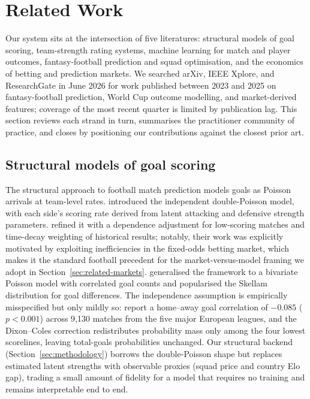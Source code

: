 \section{Related Work}
\label{sec:related_work}

Our system sits at the intersection of five literatures: structural
models of goal scoring, team-strength rating systems, machine
learning for match and player outcomes, fantasy-football prediction
and squad optimisation, and the economics of betting and prediction
markets. We searched arXiv, IEEE Xplore, and ResearchGate in June
2026 for work published between 2023 and 2025 on fantasy-football
prediction, World Cup outcome modelling, and market-derived features;
coverage of the most recent quarter is limited by publication lag.
This section reviews each strand in turn, summarises the practitioner
community of practice, and closes by positioning our contributions
against the closest prior art.

\subsection{Structural models of goal scoring}
\label{sec:related-structural}

The structural approach to football match prediction models goals as
Poisson arrivals at team-level rates. \citet{maher1982modelling}
introduced the independent double-Poisson model, with each side's
scoring rate derived from latent attacking and defensive strength
parameters. \citet{dixon1997modelling} refined it with a dependence
adjustment for low-scoring matches and time-decay weighting of
historical results; notably, their work was explicitly motivated by
exploiting inefficiencies in the fixed-odds betting market, which
makes it the standard football precedent for the market-versus-model
framing we adopt in Section~\ref{sec:related-markets}.
\citet{karlis2003analysis} generalised the framework to a bivariate
Poisson model with correlated goal counts and popularised the Skellam
distribution for goal differences. The independence assumption is
empirically misspecified but only mildly so:
\citet{petretta2025dependence} report a home--away goal correlation
of $-0.085$ ($p < 0.001$) across 9{,}130 matches from the five major
European leagues, and the Dixon--Coles correction redistributes
probability mass only among the four lowest scorelines, leaving
total-goals probabilities unchanged. Our structural backend
(Section~\ref{sec:methodology}) borrows the double-Poisson shape but
replaces estimated latent strengths with observable proxies (squad
price and country Elo gap), trading a small amount of fidelity for a
model that requires no training and remains interpretable end to end.

